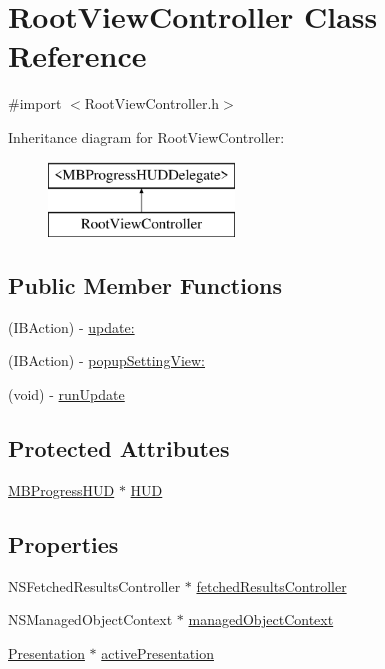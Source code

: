\hypertarget{interface_root_view_controller}{
\section{RootViewController Class Reference}
\label{interface_root_view_controller}
}


{\ttfamily \#import $<$RootViewController.h$>$}

Inheritance diagram for RootViewController:\begin{figure}[H]
\begin{center}
\leavevmode
\includegraphics[height=2.000000cm]{interface_root_view_controller}
\end{center}
\end{figure}
\subsection*{Public Member Functions}
\begin{DoxyCompactItemize}
\item 
(IBAction) -\/ \hyperlink{interface_root_view_controller_afd9e8d3ca0345010f3372d9dd8d77a08}{update:}
\item 
(IBAction) -\/ \hyperlink{interface_root_view_controller_a1a3e9ecd465f641cfbe7b3e585abd31a}{popupSettingView:}
\item 
(void) -\/ \hyperlink{interface_root_view_controller_a3642c277100c7f3c5a1aa625cf7d9c44}{runUpdate}
\end{DoxyCompactItemize}
\subsection*{Protected Attributes}
\begin{DoxyCompactItemize}
\item 
\hyperlink{interface_m_b_progress_h_u_d}{MBProgressHUD} $\ast$ \hyperlink{interface_root_view_controller_a62209f8d829db91e9c588dee85158379}{HUD}
\end{DoxyCompactItemize}
\subsection*{Properties}
\begin{DoxyCompactItemize}
\item 
NSFetchedResultsController $\ast$ \hyperlink{interface_root_view_controller_a7188ae93e075694ba7b03c301e09f8a2}{fetchedResultsController}
\item 
NSManagedObjectContext $\ast$ \hyperlink{interface_root_view_controller_adeebe5deeb50f760daa2b23db0a20d95}{managedObjectContext}
\item 
\hyperlink{interface_presentation}{Presentation} $\ast$ \hyperlink{interface_root_view_controller_ae180d02b7737a300a02c7e8de4426e1d}{activePresentation}
\end{DoxyCompactItemize}


